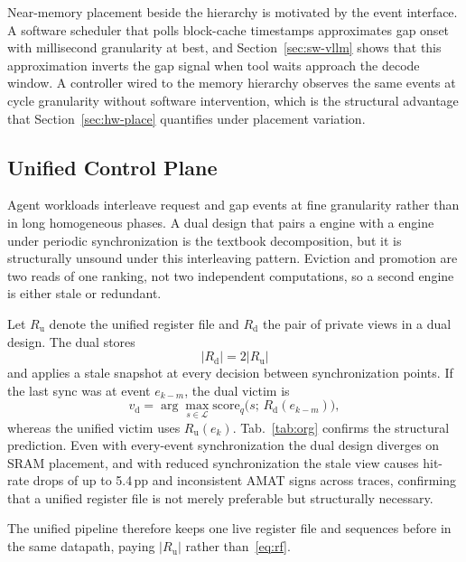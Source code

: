 Near-memory placement beside the hierarchy is motivated by the event
interface. A software scheduler that polls block-cache timestamps
approximates gap onset with millisecond granularity at best, and
Section~\ref{sec:sw-vllm} shows that this approximation inverts the
gap signal when tool waits approach the decode window. A controller
wired to the memory hierarchy observes the same events at cycle
granularity without software intervention, which is the structural
advantage that Section~\ref{sec:hw-place} quantifies under placement
variation.

\subsection{Unified Control Plane}
\label{sec:org}

Agent workloads interleave request and gap events at fine granularity
rather than in long homogeneous phases. A dual design that pairs a
\spear engine with a \tide engine under periodic synchronization is
the textbook decomposition, but it is structurally unsound under this
interleaving pattern. Eviction and promotion are two reads of one
ranking, not two independent computations, so a second engine is
either stale or redundant.

Let $R_{\mathrm{u}}$ denote the unified register file and
$R_{\mathrm{d}}$ the pair of private views in a dual design. The dual
stores
\begin{equation}
  \lvert R_{\mathrm{d}}\rvert=2\lvert R_{\mathrm{u}}\rvert
  \label{eq:rf}
\end{equation}
and applies a stale snapshot at every decision between synchronization
points. If the last sync was at event $e_{k-m}$, the dual victim is
\begin{equation}
  v_{\mathrm{d}}
  =\arg\max_{s\in\mathcal{L}}
    \mathrm{score}_{q}\!\bigl(s;\,R_{\mathrm{d}}(e_{k-m})\bigr),
  \label{eq:stale}
\end{equation}
whereas the unified victim uses $R_{\mathrm{u}}(e_{k})$.
Tab.~\ref{tab:org} confirms the structural prediction. Even with
every-event synchronization the dual design diverges on SRAM
placement, and with reduced synchronization the stale view causes
hit-rate drops of up to 5.4\,pp and inconsistent AMAT signs across
traces, confirming that a unified register file is not merely
preferable but structurally necessary.



The unified pipeline therefore keeps one live register file and
sequences \esp before \okt in the same datapath, paying
$\lvert R_{\mathrm{u}}\rvert$ rather than~\eqref{eq:rf}.

